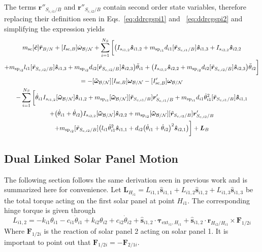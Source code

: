 \documentclass[paper]{aiaaNew}
\begin{document}
	The terms $\bm{r}''_{S_{c,i1}/B}$ and $\bm{r}''_{S_{c,i2}/B}$ contain second order state variables, therefore replacing their definition seen in Eqs.~\eqref{eq:ddrcgspi1} and ~\eqref{eq:ddrcgspi2} and simplifying the expression yields
	\begin{multline}
	m_{\text{sc}} [\tilde{\bm{c}}] \ddot{\bm r}_{B/N} + [I_{\text{sc},B}] \dot{\bm\omega}_{\cal B/N} + \sum\limits_{i=1}^{N_S} \bigg[  \big(I_{s_{i1,2}}\bm{\hat{s}}_{i1,2}+m_{\text{sp}_{i1}}d_{i1} [\tilde{\bm{r}}_{S_{c,i1}/B}]   \bm{\hat{s}}_{i1,3} + I_{s_{i2,2}}\bm{\hat{s}}_{i2,2}\\
	+m_{\text{sp}_{i2}}l_{i1} [\tilde{\bm{r}}_{S_{c,i2}/B}]  \bm{\hat{s}}_{i1,3}+m_{\text{sp}_{i2}}d_{i2} [\tilde{\bm{r}}_{S_{c,i2}/B}] \bm{\hat{s}}_{i2,3}\big) \ddot{\theta}_{i1}
	+\big( I_{s_{i2,2}}\bm{\hat{s}}_{i2,2}+m_{\text{sp}_{i2}} d_{i2} [\tilde{\bm{r}}_{S_{c,i2}/B}] \bm{\hat{s}}_{i2,3}\big)\ddot{\theta}_{i2}\bigg] \\
	= -[\bm{\tilde{\omega}}_{\cal B/N}] [I_{\text{sc},B}] \bm\omega_{\cal B/N} - [I'_{\text{sc},B}] \bm\omega_{\cal B/N} \\
	-  \sum\limits_{i=1}^{N_S} \bigg[
	\dot{\theta}_{i1} I_{s_{i1,2}} [\bm{\tilde{\omega}}_{\cal B/N}] \bm{\hat{s}}_{i1,2} 
	+m_{\text{sp}_{i1}} [\bm{\tilde{\omega}}_{\cal B/N}] [\tilde{\bm{r}}_{S_{c,i1}/B}] \bm{r}'_{S_{c,i1}/B} +m_{\text{sp}_{i1}}d_{i1}\dot{\theta}_{i1}^2  [\tilde{\bm{r}}_{S_{c,i1}/B}] \bm{\hat{s}}_{i1,1}\\
	+ \big(\dot{\theta}_{i1}+\dot{\theta}_{i2}\big) I_{s_{i2,2}}[\bm{\tilde{\omega}}_{\cal B/N}]\bm{\hat{s}}_{i2,2}
	+m_{\text{sp}_{i2}} [\bm{\tilde{\omega}}_{\cal B/N}] [\tilde{\bm{r}}_{S_{c,i2}/B}] \bm{r}'_{S_{c,i2}/B} 	\\+m_{\text{sp}_{i2}} [\tilde{\bm{r}}_{S_{c,i2}/B}] \big(l_{i1} \dot{\theta}_{i1}^2 \bm{\hat{s}}_{i1,1} + d_{i2}\big(\dot{\theta}_{i1} + \dot{\theta}_{i2}\big)^2\bm{\hat{s}}_{i2,1}\big)\bigg]
	+ \bm{L}_B 
	\label{eq:Final6}
	\end{multline}
	
	
	\subsection{Dual Linked Solar Panel Motion}
	
	The following section follows the same derivation seen in previous work\cite{Allard2016rz} and is summarized here for convenience. 
	Let $\bm L_{H_{i1}} = L_{i1,1} \hat{\bm s}_{i1,1} + L_{i1,2} \hat{\bm s}_{i1,2} + L_{i1,3} \hat{\bm s}_{i1,3}$ be the total torque acting on the first solar panel at point $H_{i1}$. The corresponding hinge torque is given through
	\begin{equation}
	L_{i1,2} = - k_{i1} \theta_{i1} - c_{i1}\dot{\theta}_{i1} +  k_{i2} \theta_{i2} + c_{i2} \dot\theta_{i2} + \hat{\bm s}_{i1,2} \cdot \bm \tau_{\text{ext}_{i1},H_{i1}} + \hat{\bm s}_{i1,2} \cdot \bm{r}_{H_{i2}/H_{i1}} \times \bm F_{1/2i}
	\label{eq:hingeTorque1}
	\end{equation}
	Where $\bm F_{1/2i}$ is the reaction of solar panel 2 acting on solar panel 1. It is important to point out that $\bm F_{1/2i} = - \bm F_{2/1i}$. 
	
\end{document}
